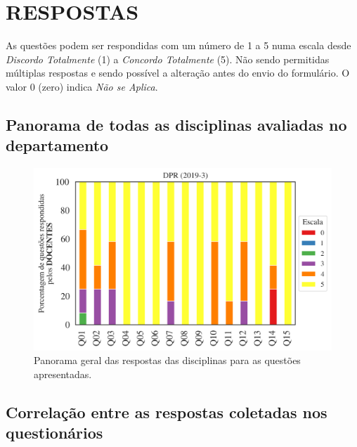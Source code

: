 \documentclass[a4paper,10pt]{article}
\begin{document}
\section{RESPOSTAS}
As questões podem ser respondidas com um número de 1 a 5 numa escala desde {\it Discordo Totalmente} (1) a {\it Concordo Totalmente} (5). Não sendo permitidas múltiplas respostas e sendo possível a alteração antes do envio do formulário. O valor 0 (zero) indica {\it Não se Aplica}.

\subsection{Panorama de todas as disciplinas avaliadas no departamento}
\begin{figure}[h]
\centering
\includegraphics[width=0.85\linewidth]{analise_geral_departamento_DPR_docentes.png}
\caption{\label{fig:analise_geral_departamento}            Panorama geral das respostas das disciplinas para as questões apresentadas.}
\end{figure}
\subsection{Correlação entre as respostas coletadas nos questionários}
\end{document}

